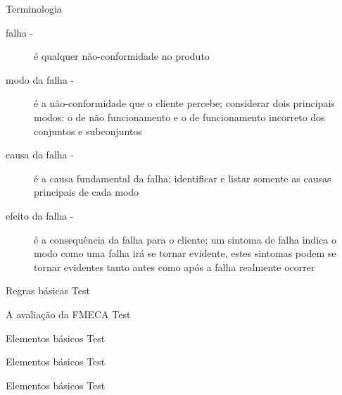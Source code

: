 \documentclass[aspectratio=169]{beamer}
\begin{document}
\begin{frame}[t]{Terminologia}
    \begin{description}
        \item[falha -] é qualquer não-conformidade no produto
        \item[modo da falha -] é a não-conformidade que o cliente percebe; considerar dois principais modos: o de não funcionamento e o de funcionamento incorreto dos conjuntos e subconjuntos
        \item[causa da falha -] é a causa fundamental da falha; identificar e listar somente as causas principais de cada modo
        \item[efeito da falha -] é a consequência da falha para o cliente; um sintoma de falha indica o modo como uma falha irá se tornar evidente, estes sintomas podem se tornar evidentes tanto antes como após a falha realmente ocorrer 
    \end{description}
\end{frame}
\begin{frame}[t]{Regras básicas}
    Test
\end{frame}
\begin{frame}[t]{A avaliação da FMECA}
    Test
\end{frame}
\begin{frame}[t]{Elementos básicos}
    Test
\end{frame}
\begin{frame}[t]{Elementos básicos}
    Test
\end{frame}
\begin{frame}[t]{Elementos básicos}
    Test
\end{frame}
\end{document}
